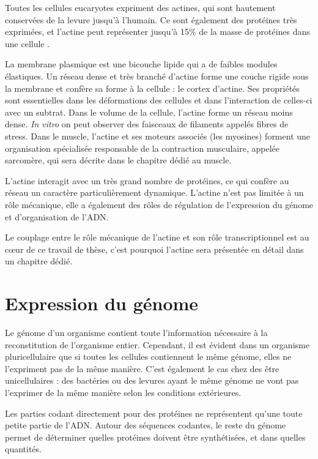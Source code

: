 Toutes les cellules eucaryotes expriment des actines, qui sont hautement conservées de la levure jusqu'à l'humain. Ce sont également des protéines très exprimées, et l'actine peut représenter jusqu'à 15\% de la masse de protéines dans une cellule \cite{Molecular Biology of the cell 4th edition}.

La membrane plasmique est une bicouche lipide qui a de faibles modules élastiques. Un réseau dense et très branché d'actine forme une couche rigide sous la membrane et confère sa forme à la cellule : le cortex d'actine. Ses propriétés sont essentielles dans les déformations des cellules et dans l'interaction de celles-ci avec un subtrat. 
Dans le volume de la cellule, l'actine forme un réseau moins dense. \textit{In vitro} on peut observer des faisceaux de filaments appelés fibres de stress. 
Dans le muscle, l'actine et ses moteurs associés (les myosines) forment une organisation spécialisée responsable de la contraction musculaire, appelée sarcomère, qui sera décrite dans le chapitre dédié au muscle.

L'actine interagit avec un très grand nombre de protéines, ce qui confère au réseau un caractère particulièrement dynamique. L'actine n'est pas limitée à un rôle mécanique, elle a également des rôles de régulation de l'expression du génome et d'organisation de l'ADN. 

Le couplage entre le rôle mécanique de l'actine et son rôle transcriptionnel est au c\oe ur de ce travail de thèse, c'est pourquoi l'actine sera présentée en détail dans un chapitre dédié. 




\section{Expression du génome}

Le génome d'un organisme contient toute l'information nécessaire à la reconstitution de l'organisme entier. Cependant, il est évident dans un organisme pluricellulaire que si toutes les cellules contiennent le même génome, elles ne l'expriment pas de la même manière. C'est également le cas chez des être unicellulaires : des bactéries ou des levures ayant le même génome ne vont pas l'exprimer de la même manière selon les conditions extérieures. 

Les parties codant directement pour des protéines ne représentent qu'une toute petite partie de l'ADN. Autour des séquences codantes, le reste du génome permet de déterminer quelles protéines doivent être synthétisées, et dans quelles quantités. 

